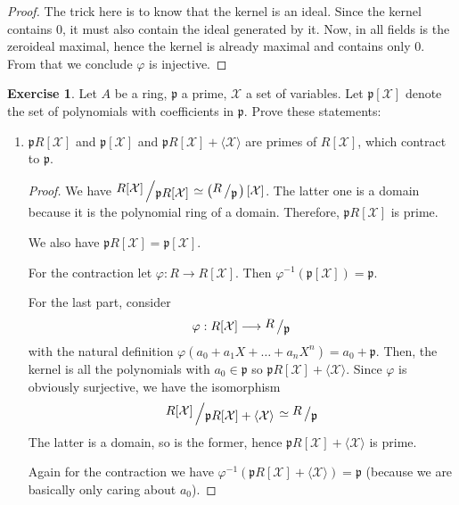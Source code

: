 \documentclass{book}
\theoremstyle{plain}
\theoremstyle{definition}
\newtheorem{exr}[thm]{Exercise}
\theoremstyle{custom_definition}
\newcommand{\bigslant}[2]{{\raisebox{.2em}{$#1$}\left/\raisebox{-.2em}{$#2$}\right.}}
\begin{document}
\begin{proof}
  The trick here is to know that the kernel is an ideal. Since the kernel contains \(0\), it must also contain the ideal generated by it. Now, in all fields is the zeroideal maximal, hence the kernel is already maximal and contains only \(0\). From that we conclude \(\varphi\) is injective.
\end{proof}

\begin{exr}
  Let \(A\) be a ring, \(\mathfrak{p}\) a prime, \(\mathcal{X}\) a set of variables. Let \(\mathfrak{p}[\mathcal{X}]\) denote the set of polynomials with coefficients in \(\mathfrak{p}\). Prove these statements:
  \begin{enumerate}
    \item \(\mathfrak{p}R[\mathcal{X}]\) and \(\mathfrak{p}[\mathcal{X}]\) and \(\mathfrak{p}R[\mathcal{X}] + \langle \mathcal{X} \rangle\) are primes of \(R[\mathcal{X}]\), which contract to \(\mathfrak{p}\).
    \begin{proof}
      We have \(\bigslant{R[\mathcal{X}]}{\mathfrak{p}R[\mathcal{X}]} \simeq \left(\bigslant{R}{\mathfrak{p}}\right)[\mathcal{X}]\). The latter one is a domain because it is the polynomial ring of a domain. Therefore, \(\mathfrak{p}R[\mathcal{X}]\) is prime.

      We also have \(\mathfrak{p}R[\mathcal{X}] = \mathfrak{p}[\mathcal{X}]\).

      For the contraction let \(\varphi: R \longrightarrow R[\mathcal{X}]\). Then \(\varphi^{-1} \left( \mathfrak{p}[\mathcal{X}] \right) = \mathfrak{p}\).

      For the last part, consider
      \begin{equation}
        \varphi: R[\mathcal{X}] \longrightarrow \bigslant{R}{\mathfrak{p}}
      \end{equation}
      with the natural definition \(\varphi\left(a_0 + a_1 X + \ldots + a_n X^n\right) = a_0 + \mathfrak{p}\). Then, the kernel is all the polynomials with \(a_0 \in \mathfrak{p}\) so \(\mathfrak{p}R[\mathcal{X}] + \langle \mathcal{X} \rangle\). Since \(\varphi\) is obviously surjective, we have the isomorphism
      \begin{equation}
        \bigslant{R[\mathcal{X}]}{\mathfrak{p}R[\mathcal{X}]+ \langle \mathcal{X} \rangle} \simeq \bigslant{R}{\mathfrak{p}}
      \end{equation}
      The latter is a domain, so is the former, hence \(\mathfrak{p}R[\mathcal{X}]+ \langle \mathcal{X} \rangle\) is prime.

      Again for the contraction we have \(\varphi^{-1}(\mathfrak{p}R[\mathcal{X}] + \langle \mathcal{X} \rangle) = \mathfrak{p}\) (because we are basically only caring about \(a_0\)).
    \end{proof}
  \end{enumerate}
\end{exr}
\end{document}
